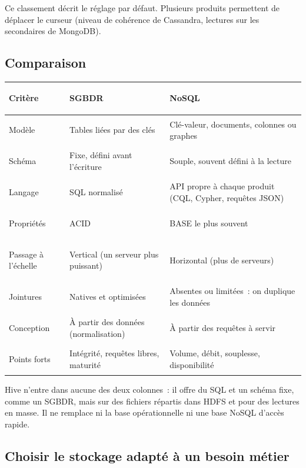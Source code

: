 \noindent Ce classement décrit le réglage par défaut. Plusieurs produits permettent de déplacer le curseur (niveau de cohérence de Cassandra, lectures sur les secondaires de MongoDB).

\subsection{Comparaison}

\begin{center}
\small
\begin{tabularx}{\textwidth}{>{\bfseries\raggedright\arraybackslash}p{2.6cm} >{\raggedright\arraybackslash}X >{\raggedright\arraybackslash}X}
\toprule
Critère & SGBDR & NoSQL \\
\midrule
Modèle & Tables liées par des clés & Clé-valeur, documents, colonnes ou graphes \\
Schéma & Fixe, défini avant l'écriture & Souple, souvent défini à la lecture \\
Langage & SQL normalisé & API propre à chaque produit (CQL, Cypher, requêtes JSON) \\
Propriétés & ACID & BASE le plus souvent \\
Passage à l'échelle & Vertical (un serveur plus puissant) & Horizontal (plus de serveurs) \\
Jointures & Natives et optimisées & Absentes ou limitées~: on duplique les données \\
Conception & À partir des données (normalisation) & À partir des requêtes à servir \\
Points forts & Intégrité, requêtes libres, maturité & Volume, débit, souplesse, disponibilité \\
\bottomrule
\end{tabularx}
\end{center}

\noindent Hive n'entre dans aucune des deux colonnes~: il offre du SQL et un schéma fixe, comme un SGBDR, mais sur des fichiers répartis dans HDFS et pour des lectures en masse. Il ne remplace ni la base opérationnelle ni une base NoSQL d'accès rapide.

\subsection{Choisir le stockage adapté à un besoin métier}


